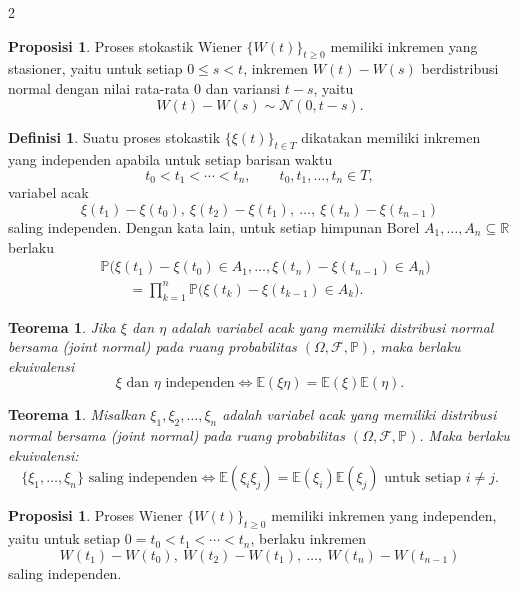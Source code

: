 \documentclass[a4paper,extrafontsizes, 9pt]{memoir}
\theoremstyle{definition}
\newtheorem{definisi}[kalstok]{Definisi}
\newtheorem{proposisi}[kalstok]{Proposisi}
\theoremstyle{plain}
\newtheorem{teorema}[kalstok]{Teorema}
\theoremstyle{remark}
\begin{document}
\begin{multicols}{2}
  \begin{proposisi}
    Proses stokastik Wiener $\{W(t)\}_{t\ge 0}$ memiliki inkremen yang stasioner, yaitu untuk
    setiap $0\le s<t$, inkremen $W(t)-W(s)$ berdistribusi normal dengan nilai rata-rata $0$ dan
    variansi $t-s$, yaitu
    \[W(t)-W(s)\sim\mathcal{N}(0,t-s).\]
  \end{proposisi}

  \begin{definisi}
    Suatu proses stokastik $\{\xi(t)\}_{t\in T}$ dikatakan memiliki inkremen yang independen
    apabila untuk setiap barisan waktu
    \[t_0<t_1<\cdots<t_n,\qquad t_0,t_1,\ldots,t_n\in T,\]
    variabel acak
    \[\xi(t_1)-\xi(t_0),\ \xi(t_2)-\xi(t_1),\ \ldots,\ \xi(t_n)-\xi(t_{n-1})\]
    saling independen. Dengan kata lain, untuk setiap himpunan Borel
    $A_1,\ldots,A_n\subseteq\mathbb{R}$ berlaku
    \begin{align*}
       & \mathbb{P}\bigl(\xi(t_1)-\xi(t_0)\in A_1,\ldots,\xi(t_n)-\xi(t_{n-1})\in A_n\bigr) \\
       & \qquad =\prod_{k=1}^{n}\mathbb{P}\bigl(\xi(t_k)-\xi(t_{k-1})\in A_k\bigr).
    \end{align*}
  \end{definisi}

  \begin{teorema}
    Jika $\xi$ dan $\eta$ adalah variabel acak yang memiliki distribusi normal bersama
    (joint normal) pada ruang probabilitas $(\Omega,\mathcal{F},\mathbb{P})$, maka berlaku
    ekuivalensi
    \[\xi\text{ dan }\eta\text{ independen}
      \iff \mathbb{E}(\xi\eta)=\mathbb{E}(\xi)\mathbb{E}(\eta).\]
  \end{teorema}

  \begin{teorema}
    Misalkan $\xi_1,\xi_2,\ldots,\xi_n$ adalah variabel acak yang memiliki distribusi normal
    bersama (joint normal) pada ruang probabilitas $(\Omega,\mathcal{F},\mathbb{P})$. Maka
    berlaku ekuivalensi:
    \[\{\xi_1,\ldots,\xi_n\}\text{ saling independen}
      \iff \mathbb{E}(\xi_i\xi_j)=\mathbb{E}(\xi_i)\mathbb{E}(\xi_j)
      \text{ untuk setiap }i\ne j.\]
  \end{teorema}

  \begin{proposisi}
    Proses Wiener $\{W(t)\}_{t\ge 0}$ memiliki inkremen yang independen, yaitu untuk setiap
    $0=t_0<t_1<\cdots<t_n$, berlaku inkremen
    \[W(t_1)-W(t_0),\ W(t_2)-W(t_1),\ \ldots,\ W(t_n)-W(t_{n-1})\]
    saling independen.
  \end{proposisi}


\end{multicols}
\end{document}
